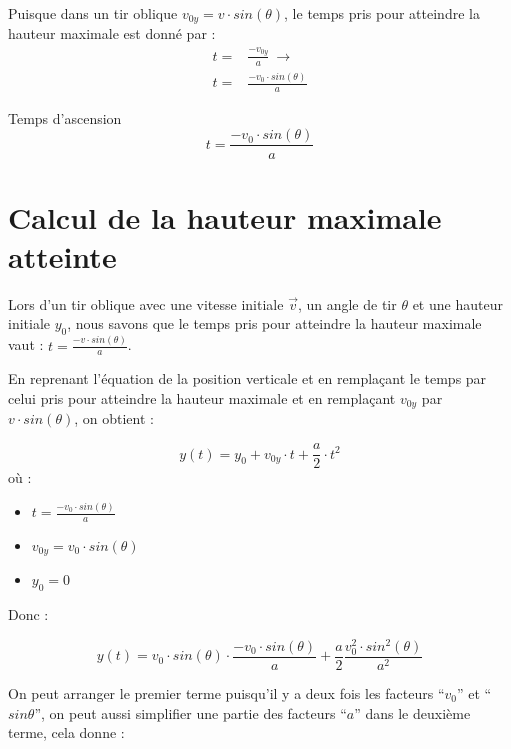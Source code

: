 Puisque dans un tir oblique \(v_{0y}=v \cdot sin(\theta)\), le temps pris pour atteindre la hauteur maximale est donné par :
\begin{align}
    t = & \frac{-v_{0y}}{a} \ \rightarrow  \\
    t = & \frac{-v_0 \cdot sin(\theta)}{a}
\end{align}

\begin{encadre_equation*}{Temps d'ascension}
    \begin{equation}
        t = \frac{-v_0 \cdot sin(\theta)}{a}
    \end{equation}
\end{encadre_equation*}

\newpage

\section{Calcul de la hauteur maximale atteinte}
Lors d'un tir oblique avec une vitesse initiale \(\vec{v}\), un angle de tir \(\theta\) et une hauteur initiale \(y_0\), nous savons que le temps pris pour atteindre la hauteur maximale vaut : \(t=\frac{-v \cdot sin(\theta)}{a}\).

En reprenant l'équation de la position verticale et en remplaçant le temps par celui pris pour atteindre la hauteur maximale et en remplaçant \(v_{0y}\) par \(v \cdot sin(\theta)\), on obtient :

\begin{equation}
    y(t)=y_0 + v_{0y} \cdot t + \frac{a}{2} \cdot t^2
\end{equation} où :

\begin{itemize}[label=\textbullet]
    \item \(t=\frac{-v_0 \cdot sin(\theta)}{a}\)
    \item \(v_{0y}=v_0 \cdot sin(\theta)\)
    \item \(y_0=0\)
\end{itemize}

Donc :

\begin{equation}
    y(t)=v_0 \cdot sin(\theta) \cdot \frac{-v_0 \cdot sin(\theta)}{a} + \frac{a}{2} \frac{v_0^2 \cdot sin^2(\theta)}{a^2}
\end{equation}

\newpage

On peut arranger le premier terme puisqu'il y a deux fois les facteurs \enquote{\(v_0\)} et \enquote{\(sin \theta\)}, on peut aussi simplifier une partie des facteurs \enquote{\(a\)} dans le deuxième terme, cela donne :

